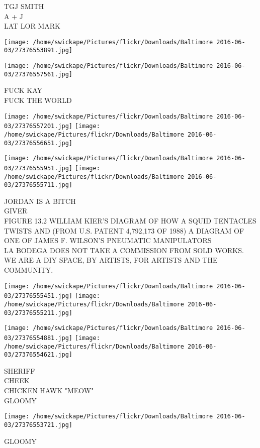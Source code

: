\documentclass[10pt,letterpaper]{article}
\begin{document}
TGJ SMITH\\
A + J\\
LAT LOR MARK
\pagebreak

\texttt{[image: /home/swickape/Pictures/flickr/Downloads/Baltimore 2016-06-03/27376553891.jpg]}

\vspace{0.25in}
\texttt{[image: /home/swickape/Pictures/flickr/Downloads/Baltimore 2016-06-03/27376557561.jpg]}

FUCK KAY\\
FUCK THE WORLD
\pagebreak

\texttt{[image: /home/swickape/Pictures/flickr/Downloads/Baltimore 2016-06-03/27376557201.jpg]}
\texttt{[image: /home/swickape/Pictures/flickr/Downloads/Baltimore 2016-06-03/27376556651.jpg]}

\texttt{[image: /home/swickape/Pictures/flickr/Downloads/Baltimore 2016-06-03/27376555951.jpg]}
\texttt{[image: /home/swickape/Pictures/flickr/Downloads/Baltimore 2016-06-03/27376555711.jpg]}

JORDAN IS A BITCH\\
GIVER\\
FIGURE 13.2 WILLIAM KIER'S DIAGRAM OF HOW A SQUID TENTACLES TWISTS AND (FROM U.S. PATENT 4,792,173 OF 1988) A DIAGRAM OF ONE OF JAMES F. WILSON'S PNEUMATIC MANIPULATORS\\
LA BODEGA DOES NOT TAKE A COMMISSION FROM SOLD WORKS.  WE ARE A DIY SPACE, BY ARTISTS, FOR ARTISTS AND THE COMMUNITY.
\pagebreak

\texttt{[image: /home/swickape/Pictures/flickr/Downloads/Baltimore 2016-06-03/27376555451.jpg]}
\texttt{[image: /home/swickape/Pictures/flickr/Downloads/Baltimore 2016-06-03/27376555211.jpg]}

\texttt{[image: /home/swickape/Pictures/flickr/Downloads/Baltimore 2016-06-03/27376554881.jpg]}
\texttt{[image: /home/swickape/Pictures/flickr/Downloads/Baltimore 2016-06-03/27376554621.jpg]}

SHERIFF\\
CHEEK\\
CHICKEN HAWK "MEOW"\\
GLOOMY
\pagebreak

\texttt{[image: /home/swickape/Pictures/flickr/Downloads/Baltimore 2016-06-03/27376553721.jpg]}

GLOOMY
\pagebreak
\end{document}
